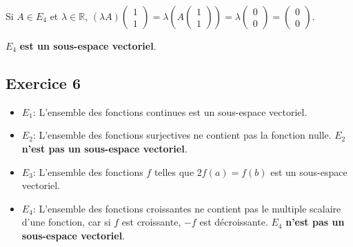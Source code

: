 \documentclass[french]{yLectureNote}
\begin{document}
\begin{itemize}
    Si $A\in E_4$ et $\lambda\in\mathbb{R}$, $(\lambda A)\begin{pmatrix}1\\1\end{pmatrix}=\lambda(A\begin{pmatrix}1\\1\end{pmatrix})=\lambda\begin{pmatrix}0\\0\end{pmatrix}=\begin{pmatrix}0\\0\end{pmatrix}$.

    $E_4$ \textbf{est un sous-espace vectoriel}.
\end{itemize}

\subsection{Exercice 6}
\begin{itemize}
    \item $E_1$: L'ensemble des fonctions continues est un sous-espace vectoriel.
    \item $E_2$: L'ensemble des fonctions surjectives ne contient pas la fonction nulle. $E_2$ \textbf{n'est pas un sous-espace vectoriel}.
    \item $E_3$: L'ensemble des fonctions $f$ telles que $2f(a)=f(b)$ est un sous-espace vectoriel.
    \item $E_4$: L'ensemble des fonctions croissantes ne contient pas le multiple scalaire d'une fonction, car si $f$ est croissante, $-f$ est décroissante. $E_4$ \textbf{n'est pas un sous-espace vectoriel}.
\end{itemize}
\end{document}
